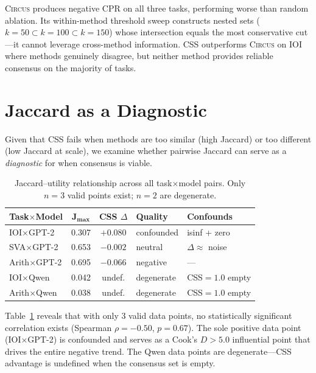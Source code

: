 \documentclass[11pt,a4paper]{article}
\newcommand{\css}{\textsc{CSS}}
\newcommand{\circus}{\textsc{Circus}}
\begin{document}
\circus{} produces negative CPR on all three tasks, performing worse than random ablation.
Its within-method threshold sweep constructs nested sets ($k{=}50 \subset k{=}100 \subset k{=}150$) whose intersection equals the most conservative cut---it cannot leverage cross-method information.
\css{} outperforms \circus{} on IOI where methods genuinely disagree, but neither method provides reliable consensus on the majority of tasks.

\section{Jaccard as a Diagnostic}
\label{sec:jaccard}

Given that \css{} fails when methods are too similar (high Jaccard) or too different (low Jaccard at scale), we examine whether pairwise Jaccard can serve as a \emph{diagnostic} for when consensus is viable.

\begin{table}[t]
\centering
\small
\begin{tabular}{lccll}
\toprule
\textbf{Task$\times$Model} & $\boldsymbol{J_{\max}}$ & \textbf{\css{} $\Delta$} & \textbf{Quality} & \textbf{Confounds} \\
\midrule
IOI$\times$GPT-2     & 0.307 & $+0.080$ & confounded & isinf + zero \\
SVA$\times$GPT-2     & 0.653 & $-0.002$ & neutral    & $\Delta \approx$ noise \\
Arith$\times$GPT-2   & 0.695 & $-0.066$ & negative   & --- \\
IOI$\times$Qwen      & 0.042 & undef.  & degenerate & \css{}$= 1.0$ empty \\
Arith$\times$Qwen    & 0.038 & undef.  & degenerate & \css{}$= 1.0$ empty \\
\bottomrule
\end{tabular}
\caption{Jaccard--utility relationship across all task$\times$model pairs. Only $n = 3$ valid points exist; $n = 2$ are degenerate.}
\label{tab:jaccard_utility}
\end{table}

Table~\ref{tab:jaccard_utility} reveals that with only 3 valid data points, no statistically significant correlation exists (Spearman $\rho = -0.50$, $p = 0.67$).
The sole positive data point (IOI$\times$GPT-2) is confounded and serves as a Cook's $D > 5.0$ influential point that drives the entire negative trend.
The Qwen data points are degenerate---\css{} advantage is undefined when the consensus set is empty.
\end{document}
